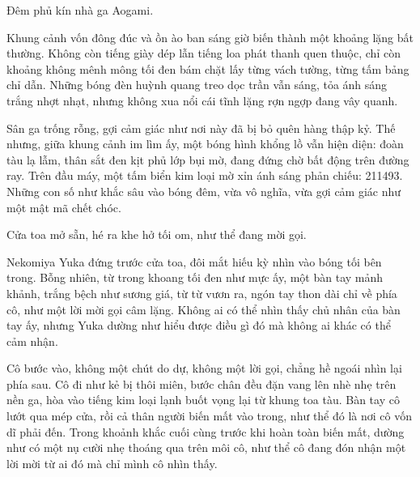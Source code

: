 \documentclass[../main.tex]{subfiles}
\begin{document}

Đêm phủ kín nhà ga Aogami.

Khung cảnh vốn đông đúc và ồn ào ban sáng giờ biến thành một khoảng lặng bất thường. Không còn tiếng giày dép lẫn tiếng loa phát thanh quen thuộc, chỉ còn khoảng không mênh mông tối đen bám chặt lấy từng vách tường, từng tấm bảng chỉ dẫn. Những bóng đèn huỳnh quang treo dọc trần vẫn sáng, tỏa ánh sáng trắng nhợt nhạt, nhưng không xua nổi cái tĩnh lặng rợn ngợp đang vây quanh.

Sân ga trống rỗng, gợi cảm giác như nơi này đã bị bỏ quên hàng thập kỷ. Thế nhưng, giữa khung cảnh im lìm ấy, một bóng hình khổng lồ vẫn hiện diện: đoàn tàu lạ lẫm, thân sắt đen kịt phủ lớp bụi mờ, đang đứng chờ bất động trên đường ray. Trên đầu máy, một tấm biển kim loại mờ xỉn ánh sáng phản chiếu: 211493. Những con số như khắc sâu vào bóng đêm, vừa vô nghĩa, vừa gợi cảm giác như một mật mã chết chóc.


Cửa toa mở sẵn, hé ra khe hở tối om, như thể đang mời gọi.

Nekomiya Yuka đứng trước cửa toa, đôi mắt hiếu kỳ nhìn vào bóng tối bên trong. Bỗng nhiên, từ trong khoang tối đen như mực ấy, một bàn tay mảnh khảnh, trắng bệch như sương giá, từ từ vươn ra, ngón tay thon dài chỉ về phía cô, như một lời mời gọi câm lặng. Không ai có thể nhìn thấy chủ nhân của bàn tay ấy, nhưng Yuka dường như hiểu được điều gì đó mà không ai khác có thể cảm nhận.

Cô bước vào, không một chút do dự, không một lời gọi, chẳng hề ngoái nhìn lại phía sau. Cô đi như kẻ bị thôi miên, bước chân đều đặn vang lên nhè nhẹ trên nền ga, hòa vào tiếng kim loại lạnh buốt vọng lại từ khung toa tàu. Bàn tay cô lướt qua mép cửa, rồi cả thân người biến mất vào trong, như thể đó là nơi cô vốn dĩ phải đến. Trong khoảnh khắc cuối cùng trước khi hoàn toàn biến mất, dường như có một nụ cười nhẹ thoáng qua trên môi cô, như thể cô đang đón nhận một lời mời từ ai đó mà chỉ mình cô nhìn thấy.
\end{document}
